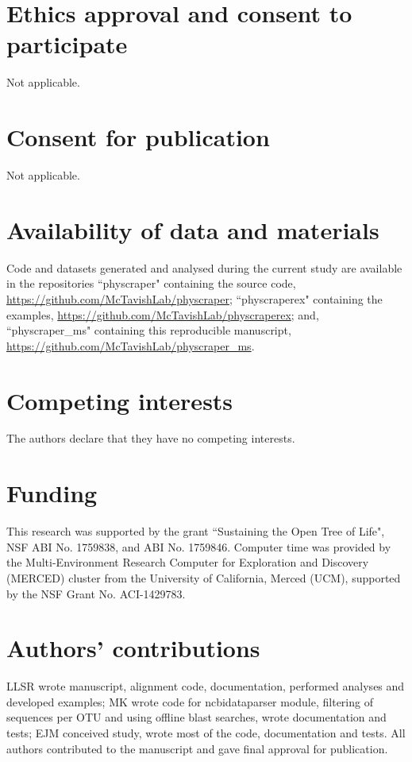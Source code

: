 \documentclass{bmcart}
\begin{document}
\begin{backmatter}

\section*{Ethics approval and consent to participate}
Not applicable.

\section*{Consent for publication}
Not applicable.

\section*{Availability of data and materials}

Code and datasets generated and analysed during the current study are available in
the repositories ``physcraper" containing the source code,
\href{https://github.com/McTavishLab/physcraper}{https://github.com/McTavishLab/physcraper};
 ``physcraperex" containing the examples,
\href{https://github.com/McTavishLab/physcraperex}{https://github.com/McTavishLab/physcraperex};
and, ``physcraper\_ms" containing this reproducible manuscript,
\href{https://github.com/McTavishLab/physcraper\_ms}{https://github.com/McTavishLab/physcraper\_ms}.

\section*{Competing interests}
The authors declare that they have no competing interests.

\section*{Funding}
This research was supported by the grant ``Sustaining the Open Tree of Life", NSF ABI
No. 1759838, and ABI No. 1759846.
Computer time was provided by the Multi-Environment Research Computer for
Exploration and Discovery (MERCED) cluster from the University of California,
Merced (UCM), supported by the NSF Grant No. ACI-1429783.

\section*{Authors' contributions}
LLSR wrote manuscript, alignment code, documentation, performed analyses and developed examples; MK wrote code for ncbidataparser module, filtering of sequences per OTU and using offline blast searches, wrote documentation and tests; EJM conceived study, wrote most of the code, documentation and tests.
All authors contributed to the manuscript and gave final approval for publication.



\end{backmatter}
\end{document}
